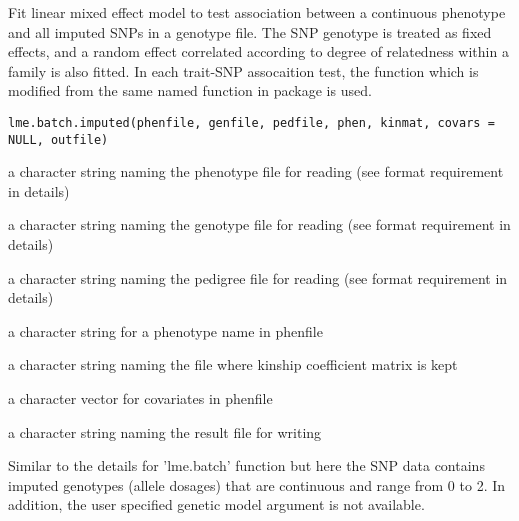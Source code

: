\begin{Description}\relax
Fit linear mixed effect model to test association between a continuous phenotype 
and all imputed SNPs in a genotype file. The SNP genotype is treated
as fixed effects, and a random effect correlated according to degree of relatedness within a 
family is also fitted. In each trait-SNP assocaition test, the  function which is modified from
the same named function in package  is used.
\end{Description}
\begin{Usage}
\begin{verbatim}
lme.batch.imputed(phenfile, genfile, pedfile, phen, kinmat, covars = NULL, outfile)
\end{verbatim}
\end{Usage}
\begin{Arguments}
\begin{ldescription}
\item[\code{phenfile}] a character string naming the phenotype file for reading (see format requirement in details) 
\item[\code{genfile}] a character string naming the genotype file for reading (see format requirement in details) 
\item[\code{pedfile}] a character string naming the pedigree file for reading (see format requirement in details)
\item[\code{phen}] a character string for a phenotype name in phenfile  
\item[\code{kinmat}] a character string naming the file where kinship coefficient matrix is kept 
\item[\code{covars}] a character vector for covariates in phenfile 
\item[\code{outfile}] a character string naming the result file for writing 
\end{ldescription}
\end{Arguments}
\begin{Details}\relax
Similar to the details for 'lme.batch' function but here the SNP data contains imputed genotypes (allele dosages) 
that are continuous and range from 0 to 2. In addition, the user 
specified genetic model argument is not available.
\end{Details}
